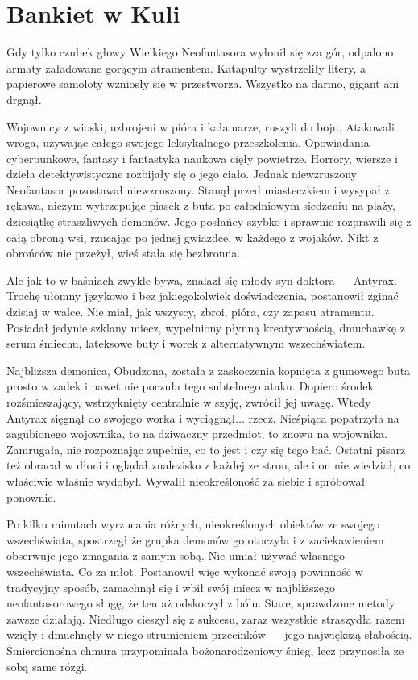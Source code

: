 \chapter{Bankiet w Kuli}


Gdy tylko czubek głowy Wielkiego Neofantasora wyłonił się zza gór, odpalono armaty załadowane gorącym atramentem.
Katapulty wystrzeliły litery, a papierowe samoloty wzniosły się w przestworza.
Wszystko na darmo, gigant ani drgnął.

Wojownicy z wioski, uzbrojeni w pióra i kałamarze, ruszyli do boju.
Atakowali wroga, używając całego swojego leksykalnego przeszkolenia. Opowiadania cyberpunkowe, fantasy i fantastyka naukowa cięły powietrze.
Horrory, wiersze i dzieła detektywistyczne rozbijały się o jego ciało.
Jednak niewzruszony Neofantasor pozostawał niewzruszony.
Stanął przed miasteczkiem i wysypał z rękawa, niczym wytrzepując piasek z buta po całodniowym siedzeniu na plaży, dziesiątkę straszliwych demonów.
Jego posłańcy szybko i sprawnie rozprawili się z całą obroną wsi, rzucając po jednej gwiazdce, w każdego z wojaków.
Nikt z obrońców nie przeżył, wieś stała się bezbronna.

Ale jak to w baśniach zwykle bywa, znalazł się młody syn doktora --- Antyrax.
Trochę ułomny językowo i bez jakiegokolwiek doświadczenia, postanowił zginąć dzisiaj w walce.
Nie miał, jak wszyscy, zbroi, pióra, czy zapasu atramentu.
Posiadał jedynie szklany miecz, wypełniony płynną kreatywnością, dmuchawkę z serum śmiechu, lateksowe buty i worek z alternatywnym wszechświatem.

Najbliższa demonica, Obudzona, została z zaskoczenia kopnięta z gumowego buta prosto w zadek i nawet nie poczuła tego subtelnego ataku.
Dopiero środek rozśmieszający, wstrzyknięty centralnie w szyję, zwrócił jej uwagę.
Wtedy Antyrax sięgnął do swojego worka i wyciągnął... rzecz.
Nieśpiąca popatrzyła na zagubionego wojownika, to na dziwaczny przedmiot, to znowu na wojownika. 
Zamrugała, nie rozpoznając zupełnie, co to jest i czy się tego bać.
Ostatni pisarz też obracał w dłoni i oglądał znalezisko z każdej ze stron, ale i on nie wiedział, co właściwie właśnie wydobył.
Wywalił nieokreśloność za siebie i spróbował ponownie.

Po kilku minutach wyrzucania różnych, nieokreślonych obiektów ze swojego wszechświata, spostrzegł że grupka demonów go otoczyła i z zaciekawieniem obserwuje jego zmagania z samym sobą.
Nie umiał używać własnego wszechświata. Co za młot. 
Postanowił więc wykonać swoją powinność w tradycyjny sposób, zamachnął się i wbił swój miecz w najbliższego neofantasorowego sługę, że ten aż odskoczył z bólu. 
Stare, sprawdzone metody zawsze działają.
Niedługo cieszył się z sukcesu, zaraz wszystkie straszydła razem wzięły i dmuchnęły w niego strumieniem przecinków --- jego największą słabością.
Śmiercionośna chmura przypominała bożonarodzeniowy śnieg, lecz przynosiła ze sobą same rózgi.

